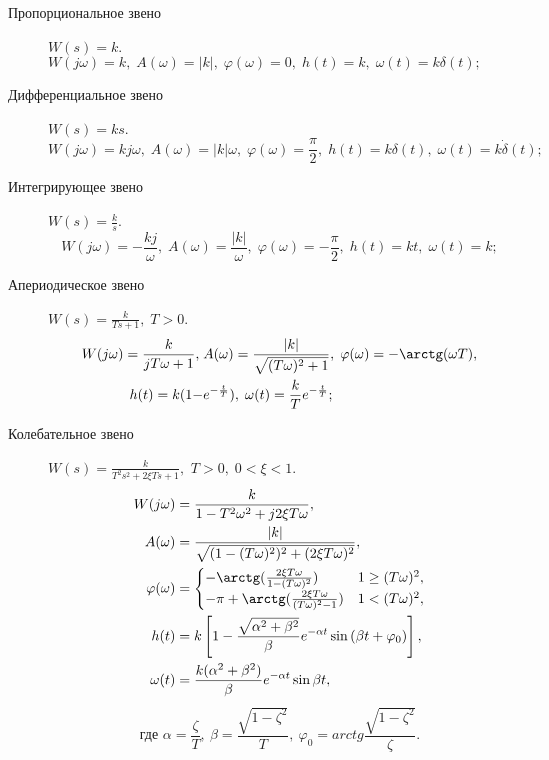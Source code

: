 \documentclass[../../TAU.tex]{subfiles}
\begin{document}
\begin{description}
    \item[Пропорциональное звено]
        $W(s)=k$.  
        $W(j\omega) = k,\; A(\omega) = |k|,\; \varphi(\omega) = 0,\; h(t) = k,\; \omega(t) = k\delta(t);$

    \item[Дифференциальное звено]
        $W(s) = ks$.
        $$
            W(j\omega) = kj\omega,\; A(\omega) = |k|\omega, \; \varphi(\omega) = \frac{\pi}{2},\; h(t) = k\delta(t),\; \omega(t) = k\dot\delta(t);
        $$

    \item[Интегрирующее звено]
        $W(s) = \frac{k}{s}$.
        $$
            W(j\omega) = -\frac{k j}{\omega},\; A(\omega) = \frac{|k|}{\omega},\; \varphi(\omega) = -\frac{\pi}{2},\; h(t) = kt,\; \omega(t) = k;
        $$

    \item[Апериодическое звено] 
        $W(s) = \frac{k}{Ts+1},\; T>0$.
        $$
            \begin{aligned}
                W(j\omega) = \frac{k}{jT\omega+1},\; &A(\omega) = \frac{|k|}{\sqrt{(T\omega)^2+1}},\; \varphi(\omega) = -\arctg(\omega T),\\ h(t) = k(1-&e^{-\frac{t}{T}}),\; \omega(t) = \frac{k}{T}e^{-\frac{t}{T}};
            \end{aligned}
        $$

    \item[Колебательное звено]
        $W(s) = \frac{k}{T^2s^2+2\xi Ts+1},$ $T>0,\; 0 < \xi < 1.$
        $$
            \begin{aligned}
                W(j\omega) &= \frac{k}{1-T^2\omega^2 +j2\xi T\omega},\\
                A(\omega) &= \frac{|k|}{\sqrt{(1-(T\omega)^2)^2 + (2\xi T\omega)^2}},\\
                \varphi(\omega) &=
                \begin{cases}
                    -\arctg(\frac{2\xi T\omega}{1-(T\omega)^2}) & 1 \ge (T\omega)^2,\\
                    -\pi+\arctg(\frac{2\xi T\omega}{(T\omega)^2-1}) & 1 < (T\omega)^2,
                \end{cases}\\
                h(t) &= k\left[1-\frac{\sqrt{\alpha^2+\beta^2}}{\beta} e^{-\alpha t} \sin{(\beta t+\varphi_0)}\right],\\
                \omega(t) &= \frac{k (\alpha^2 + \beta^2)}{\beta} e^{-\alpha t} \sin{\beta  t},
            \end{aligned}
        $$
        $$
            \text{где } \alpha = \frac{\zeta}{T},\ \beta=\frac{\sqrt{1-\zeta^2}}{T},\ \varphi_0=arctg{\frac{\sqrt{1-\zeta^2}}{\zeta}}.
        $$


\end{description}
\end{document}

